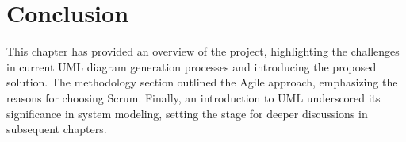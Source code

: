 \section{Conclusion}
This chapter has provided an overview of the project, highlighting the challenges in current UML diagram generation processes and introducing the proposed solution. The methodology section outlined the Agile approach, emphasizing the reasons for choosing Scrum. Finally, an introduction to UML underscored its significance in system modeling, setting the stage for deeper discussions in subsequent chapters.

